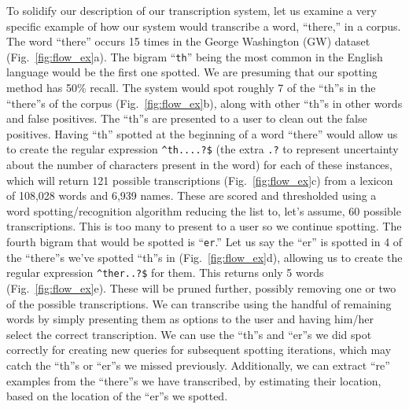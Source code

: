 \documentclass[ms]{byuprop}
\begin{document}
To solidify our description of our transcription system, let us examine a very specific example of how our system would transcribe a word, ``there,'' in a corpus. The word ``there'' occurs 15 times in the George Washington (GW) dataset \cite{GW} (Fig.~\ref{fig:flow_ex}a). The bigram ``\texttt{th}'' being the most common in the English language would be the first one spotted. We are presuming that our spotting method has 50\% recall. The system would spot roughly 7 of the ``th''s in the ``there''s of the corpus (Fig.~\ref{fig:flow_ex}b), along with other ``th''s in other words and false positives. The ``th''s are presented to a user to clean out the false positives. Having ``th'' spotted at the beginning of a word ``there'' would allow us to create the regular expression \texttt{{\textasciicircum}th....?\$} (the extra \texttt{.?} to represent uncertainty about the number of characters present in the word) for each of these instances, which will return 121 possible transcriptions (Fig.~\ref{fig:flow_ex}c) from a lexicon of 108,028 words and 6,939 names. These are scored and thresholded using a word spotting/recognition algorithm reducing the list to, let's assume, 60 possible transcriptions. This is too many to present to a user so we continue spotting. The fourth bigram that would be spotted is ``\texttt{er}.'' Let us say the ``er'' is spotted in 4 of the ``there''s we've spotted ``th''s in (Fig.~\ref{fig:flow_ex}d), allowing us to create the regular expression \texttt{{\textasciicircum}ther..?\$} for them. This returns only 5 words (Fig.~\ref{fig:flow_ex}e). These will be pruned further, possibly removing one or two of the possible transcriptions. We can transcribe using the handful of remaining words by simply presenting them as options to the user and having him/her select the correct transcription. We can use the ``th''s and ``er''s we did spot correctly for creating new queries for subsequent spotting iterations, which may catch the ``th''s or ``er''s we missed previously. Additionally, we can extract  ``re'' examples from the ``there''s we have transcribed, by estimating their location, based on the location of the ``er''s we spotted.
\end{document}
